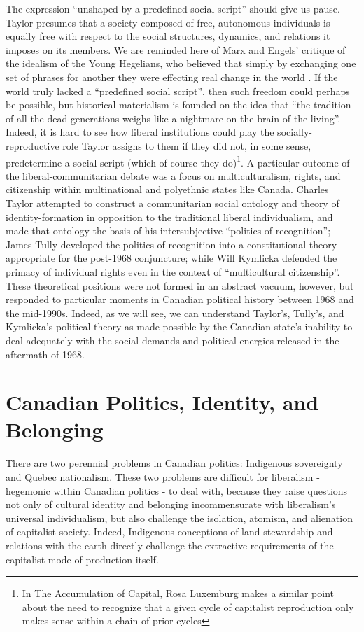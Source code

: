 \documentclass[12pt,oneside]{memoir}
\begin{document}
The expression ``unshaped by a predefined social script'' should give us pause. Taylor presumes that a society composed of free, autonomous individuals is equally free with respect to the social structures, dynamics, and relations it imposes on its members. We are reminded here of Marx and Engels' critique of the idealism of the Young Hegelians, who believed that simply by exchanging one set of phrases for another they were effecting real change in the world \citep[34-36]{MarxEngels1976}. If the world truly lacked a ``predefined social script'', then such freedom could perhaps be possible, but historical materialism is founded on the idea that ``the tradition of all the dead generations weighs like a nightmare on the brain of the living''. Indeed, it is hard to see how liberal institutions could play the socially-reproductive role Taylor assigns to them if they did not, in some sense, predetermine a social script (which of course they do)\footnote{In The Accumulation of Capital, Rosa Luxemburg makes a similar point about the need to recognize that a given cycle of capitalist reproduction only makes sense within a chain of prior cycles}.
A particular outcome of the liberal-communitarian debate was a focus on multiculturalism, rights, and citizenship within multinational and polyethnic states like Canada. Charles Taylor attempted to construct a communitarian social ontology and theory of identity-formation in opposition to the traditional liberal individualism, and made that ontology the basis of his intersubjective ``politics of recognition''; James Tully developed the politics of recognition into a constitutional theory appropriate for the post-1968 conjuncture; while Will Kymlicka defended the primacy of individual rights even in the context of ``multicultural citizenship''. These theoretical positions were not formed in an abstract vacuum, however, but responded to particular moments in Canadian political history between 1968 and the mid-1990s. Indeed, as we will see, we can understand Taylor's, Tully's, and Kymlicka's political theory as made possible by the Canadian state's inability to deal adequately with the social demands and political energies released in the aftermath of 1968.

\section*{Canadian Politics, Identity, and Belonging}

There are two perennial problems in Canadian politics: Indigenous sovereignty and Quebec nationalism. These two problems are difficult for liberalism - hegemonic within Canadian politics - to deal with, because they raise questions not only of cultural identity and belonging incommensurate with liberalism's universal individualism, but also challenge the isolation, atomism, and alienation of capitalist society. Indeed, Indigenous conceptions of land stewardship and relations with the earth directly challenge the extractive requirements of the capitalist mode of production itself.
\end{document}
